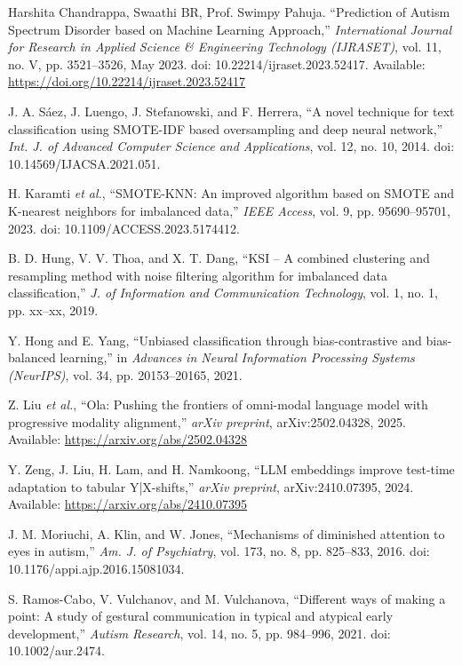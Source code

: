 \documentclass[conference]{IEEEtran}
\begin{document}
\begin{thebibliography}{99}

 Harshita Chandrappa, Swaathi BR, Prof. Swimpy Pahuja. ``Prediction of Autism Spectrum Disorder based on Machine Learning Approach,'' \textit{International Journal for Research in Applied Science \& Engineering Technology (IJRASET)}, vol. 11, no. V, pp. 3521–3526, May 2023. doi: 10.22214/ijraset.2023.52417.
Available: \url{https://doi.org/10.22214/ijraset.2023.52417}

 J. A. Sáez, J. Luengo, J. Stefanowski, and F. Herrera, ``A novel technique for text classification using SMOTE-IDF based oversampling and deep neural network,'' \textit{Int. J. of Advanced Computer Science and Applications}, vol. 12, no. 10, 2014. doi: 10.14569/IJACSA.2021.051.

 H. Karamti \textit{et al.}, ``SMOTE-KNN: An improved algorithm based on SMOTE and K-nearest neighbors for imbalanced data,'' \textit{IEEE Access}, vol. 9, pp. 95690--95701, 2023. doi: 10.1109/ACCESS.2023.5174412.

 B. D. Hung, V. V. Thoa, and X. T. Dang, ``KSI – A combined clustering and resampling method with noise filtering algorithm for imbalanced data classification,'' \textit{J. of Information and Communication Technology}, vol. 1, no. 1, pp. xx--xx, 2019.

 Y. Hong and E. Yang, ``Unbiased classification through bias-contrastive and bias-balanced learning,'' in \textit{Advances in Neural Information Processing Systems (NeurIPS)}, vol. 34, pp. 20153--20165, 2021.

 Z. Liu \textit{et al.}, ``Ola: Pushing the frontiers of omni-modal language model with progressive modality alignment,'' \textit{arXiv preprint}, arXiv:2502.04328, 2025. Available: \url{https://arxiv.org/abs/2502.04328}

 Y. Zeng, J. Liu, H. Lam, and H. Namkoong, ``LLM embeddings improve test-time adaptation to tabular Y|X-shifts,'' \textit{arXiv preprint}, arXiv:2410.07395, 2024. Available: \url{https://arxiv.org/abs/2410.07395}

 J. M. Moriuchi, A. Klin, and W. Jones, ``Mechanisms of diminished attention to eyes in autism,'' \textit{Am. J. of Psychiatry}, vol. 173, no. 8, pp. 825--833, 2016. doi: 10.1176/appi.ajp.2016.15081034.

 S. Ramos-Cabo, V. Vulchanov, and M. Vulchanova, ``Different ways of making a point: A study of gestural communication in typical and atypical early development,'' \textit{Autism Research}, vol. 14, no. 5, pp. 984--996, 2021. doi: 10.1002/aur.2474.


\end{thebibliography}
\end{document}
